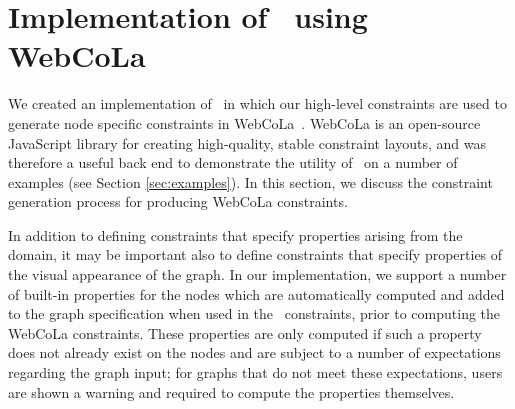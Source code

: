 \section{Implementation of \projectname~using WebCoLa}
We created an implementation of \projectname~in which our high-level
constraints are used to generate node specific constraints in
WebCoLa~\cite{WebCoLa}. WebCoLa is an open-source JavaScript library for
creating high-quality, stable constraint layouts, and was therefore a
useful back end to demonstrate the utility of \projectname~on a number of
examples (see Section \ref{sec:examples}). In this section, we discuss the
constraint generation process for producing WebCoLa constraints.


In addition to defining constraints that specify properties arising from
the domain, it may be important also to define constraints that specify
properties of the visual appearance of the graph. In our
implementation, we support a number of built-in properties for the nodes
which are automatically computed and added to the graph specification when
used in the \projectname~constraints, prior to computing the WebCoLa
constraints. These properties are only computed if such a property does not
already exist on the nodes and are subject to a number of expectations
regarding the graph input; for graphs that do not meet these expectations,
users are shown a warning and required to compute the properties
themselves.


